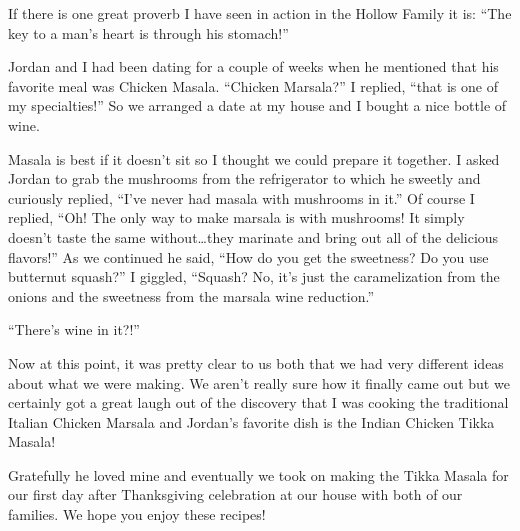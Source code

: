 If there is one great proverb I have seen in action in the Hollow Family it is:
``The key to a man's heart is through his stomach!''

Jordan and I had been dating for a couple of weeks when he mentioned that his
favorite meal was Chicken Masala. ``Chicken Marsala?'' I replied, ``that is one of
my specialties!'' So we arranged a date at my house and I bought a nice bottle of wine. 

Masala is best if it doesn't sit so I thought we could prepare it together.
I asked Jordan to grab the mushrooms from the refrigerator to which he sweetly
and curiously replied, ``I've never had masala with mushrooms in it.'' Of course
I replied, ``Oh! The only way to make marsala is with mushrooms! It simply
doesn't taste the same without{\ldots}they marinate and bring out all of the
delicious flavors!'' As we continued he said, ``How do you get the sweetness? Do
you use butternut squash?'' I giggled, ``Squash? No, it's just the caramelization
from the onions and the sweetness from the marsala wine reduction.''

``There's wine in it?!''

Now at this point, it was pretty clear to us both that we had very different
ideas about what we were making. We aren't really sure how it finally came out
but we certainly got a great laugh out of the discovery that I was cooking the
traditional Italian Chicken Marsala and Jordan's favorite dish is the Indian
Chicken Tikka Masala!

Gratefully he loved mine and eventually we took on making the Tikka Masala for
our first day after Thanksgiving celebration at our house with both of our
families. We hope you enjoy these recipes!

